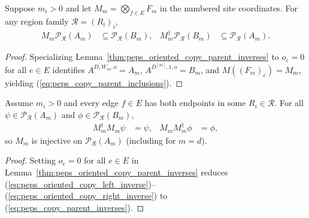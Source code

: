 \begin{lemma}%
    \label{thm:peps_copy_parent_inclusions}
    \leanok
    Suppose $m_i>0$ and let $M_m=\bigotimes_{f\in E}F_m$ in the numbered site coordinates. For any region family $\mathcal R=(R_i)_i$,
    \begin{align}
        M_m\mathcal P_{\mathcal R}(A_m) & \subseteq\mathcal P_{\mathcal R}(B_m),
                                        & M_m^\dagger\mathcal P_{\mathcal R}(B_m) & \subseteq\mathcal P_{\mathcal R}(A_m).
        \label{eq:peps_copy_parent_inclusions}
    \end{align}
\end{lemma}
\begin{proof}\leanok
    Specializing Lemma~\ref{thm:peps_oriented_copy_parent_inverses} to $o_e=0$ for all $e\in E$ identifies $A^{D,W_m,o}=A_m$, $A^{D^{[m]},1,o}=B_m$, and $M((F_m)_e)=M_m$, yielding (\ref{eq:peps_copy_parent_inclusions}).
\end{proof}

\begin{lemma}%
    \label{thm:peps_copy_parent_inverses}
    \leanok
    Assume $m_i>0$ and every edge $f\in E$ has both endpoints in some $R_i\in\mathcal R$. For all $\psi\in\mathcal P_{\mathcal R}(A_m)$ and $\phi\in\mathcal P_{\mathcal R}(B_m)$,
    \begin{align}
        M_m^\dagger M_m\psi & =\psi,
                            & M_mM_m^\dagger\phi & =\phi,
        \label{eq:peps_copy_parent_inverses}
    \end{align}
    so $M_m$ is injective on $\mathcal P_{\mathcal R}(A_m)$ (including for $m=d$).
\end{lemma}
\begin{proof}\leanok
    Setting $o_e=0$ for all $e\in E$ in Lemma~\ref{thm:peps_oriented_copy_parent_inverses} reduces (\ref{eq:peps_oriented_copy_left_inverse})--(\ref{eq:peps_oriented_copy_right_inverse}) to (\ref{eq:peps_copy_parent_inverses}).
\end{proof}

